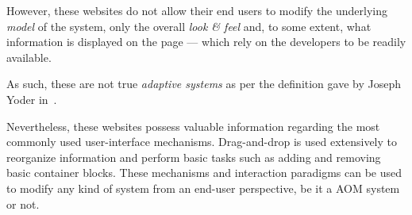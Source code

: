 However, these websites do not allow their end users to modify the underlying \emph{model} of the system, only the overall \emph{look \& feel} and, to some extent, what information is displayed on the page --- which rely on the developers to be readily available.

As such, these are not true \emph{adaptive systems} as per the definition gave by Joseph Yoder in~\cite{YJ02}.

Nevertheless, these websites possess valuable information regarding the most commonly used user-interface mechanisms. Drag-and-drop is used extensively to reorganize information and perform basic tasks such as adding and removing basic container blocks. These mechanisms and interaction paradigms can be used to modify any kind of system from an end-user perspective, be it a AOM system or not.
